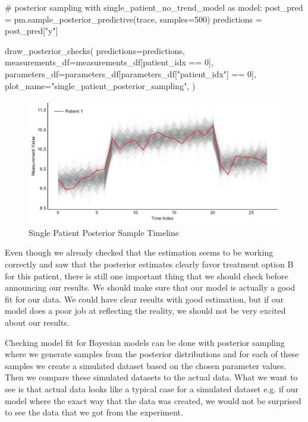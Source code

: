 \documentclass[12pt,a4paper,leqno]{report}
\theoremstyle{plain}
\theoremstyle{definition}
\theoremstyle{remark}
\begin{document}
\bigskip
\begin{pyverbatim}
# posterior sampling
with single_patient_no_trend_model as model:
    post_pred = pm.sample_posterior_predictive(trace, samples=500)
    predictions = post_pred["y"]

draw_posterior_checks(
    predictions=predictions,
    measurements_df=measurements_df[patient_idx == 0],
    parameters_df=parameters_df[parameters_df["patient_idx"] == 0],
    plot_name="single_patient_posterior_sampling",
)
\end{pyverbatim}
\bigskip

\bigskip
\begin{figure}[H]
    \caption{Single Patient Posterior Sample Timeline}
    \label{singlepatientposteriortimeline}
    \bigskip
    \includegraphics[width=\textwidth,height=\textheight,keepaspectratio]{posterior_sample_timeline_single_patient.pdf}
\end{figure}
\bigskip

Even though we already checked that the estimation seems to be working correctly and saw
that the posterior estimates clearly favor treatment option B for this patient, there is
still one important thing that we should check before announcing our results. We should
make sure that our model is actually a good fit for our data. We could have clear
results with good estimation, but if our model does a poor job at reflecting the
reality, we should not be very excited about our results.

Checking model fit for Bayesian models can be done with posterior sampling where we generate samples from
the posterior distributions and for each of these samples we create a simulated dataset based
on the chosen parameter values. Then we compare these simulated datasets to the actual
data. What we want to see is that actual data looks like a typical case for a simulated
dataset e.g. if our model where the exact way that the data was created, we would not be
surprised to see the data that we got from the experiment.
\end{document}
